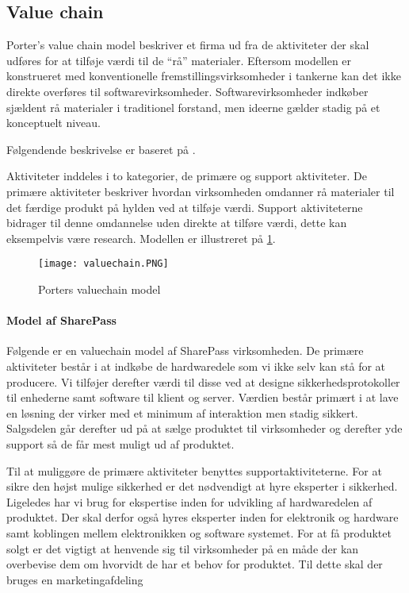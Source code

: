 \subsection{Value chain}


Porter's value chain model beskriver et firma ud fra de aktiviteter der skal udføres for at tilføje værdi til de ``rå'' materialer.
Eftersom modellen er konstrueret med konventionelle fremstillingsvirksomheder i tankerne kan det ikke direkte overføres til softwarevirksomheder.
Softwarevirksomheder indkøber sjældent rå materialer i traditionel forstand, men ideerne gælder stadig på et konceptuelt niveau.

Følgendende beskrivelse er baseret på \citet[p.~12]{rose2012software}.

Aktiviteter inddeles i to kategorier, de primære og support aktiviteter.
De primære aktiviteter beskriver hvordan virksomheden omdanner rå materialer til det færdige produkt på hylden ved at tilføje værdi.
Support aktiviteterne bidrager til denne omdannelse uden direkte at tilføre værdi, dette kan eksempelvis være research.
Modellen er illustreret på  \cref{valuechain}.

\begin{figure}[H]
	\texttt{[image: valuechain.PNG]}
	\caption{Porters valuechain model}
	\label{valuechain}
\end{figure}

\paragraph{Model af SharePass}
Følgende er en valuechain model af SharePass virksomheden.
De primære aktiviteter består i at indkøbe de hardwaredele som vi ikke selv kan stå for at producere.
Vi tilføjer derefter værdi til disse ved at designe sikkerhedsprotokoller til enhederne samt software til klient og server.
Værdien består primært i at lave en løsning der virker med et minimum af interaktion men stadig sikkert.
Salgsdelen går derefter ud på at sælge produktet til virksomheder og derefter yde support så de får mest muligt ud af produktet.

Til at muliggøre de primære aktiviteter benyttes supportaktiviteterne.
For at sikre den højst mulige sikkerhed er det nødvendigt at hyre eksperter i sikkerhed.
Ligeledes har vi brug for ekspertise inden for udvikling af hardwaredelen af produktet.
Der skal derfor også hyres eksperter inden for elektronik og hardware samt koblingen mellem elektronikken og software systemet.
For at få produktet solgt er det vigtigt at henvende sig til virksomheder på en måde der kan overbevise dem om hvorvidt de har et behov for produktet.
Til dette skal der bruges en marketingafdeling

